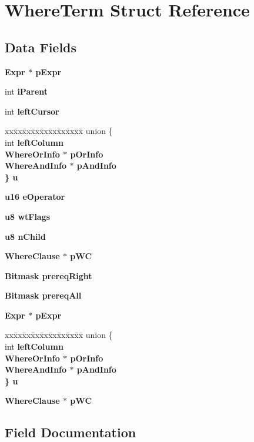 \section{Where\-Term Struct Reference}
\label{structWhereTerm}
\subsection*{Data Fields}
\begin{CompactItemize}
\item 
\bf{Expr} $\ast$ \bf{p\-Expr}
\item 
int \bf{i\-Parent}
\item 
int \bf{left\-Cursor}
\item 
\begin{tabbing}
xx\=xx\=xx\=xx\=xx\=xx\=xx\=xx\=xx\=\kill
union \{\\
\>int \bf{leftColumn}\\
\>\bf{WhereOrInfo} $\ast$ \bf{pOrInfo}\\
\>\bf{WhereAndInfo} $\ast$ \bf{pAndInfo}\\
\} \bf{u}\\

\end{tabbing}\item 
\bf{u16} \bf{e\-Operator}
\item 
\bf{u8} \bf{wt\-Flags}
\item 
\bf{u8} \bf{n\-Child}
\item 
\bf{Where\-Clause} $\ast$ \bf{p\-WC}
\item 
\bf{Bitmask} \bf{prereq\-Right}
\item 
\bf{Bitmask} \bf{prereq\-All}
\item 
\bf{Expr} $\ast$ \bf{p\-Expr}
\item 
\begin{tabbing}
xx\=xx\=xx\=xx\=xx\=xx\=xx\=xx\=xx\=\kill
union \{\\
\>int \bf{leftColumn}\\
\>\bf{WhereOrInfo} $\ast$ \bf{pOrInfo}\\
\>\bf{WhereAndInfo} $\ast$ \bf{pAndInfo}\\
\} \bf{u}\\

\end{tabbing}\item 
\bf{Where\-Clause} $\ast$ \bf{p\-WC}
\end{CompactItemize}


\subsection{Field Documentation}
